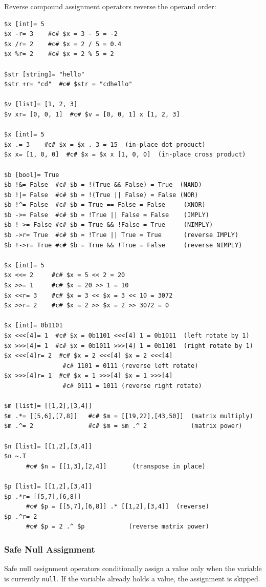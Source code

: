 Reverse compound assignment operators reverse the operand order:
\begin{verbatim}
$x [int]= 5
$x -r= 3    #c# $x = 3 - 5 = -2
$x /r= 2    #c# $x = 2 / 5 = 0.4
$x %r= 2    #c# $x = 2 % 5 = 2

$str [string]= "hello"
$str +r= "cd"  #c# $str = "cdhello"

$v [list]= [1, 2, 3]
$v xr= [0, 0, 1]  #c# $v = [0, 0, 1] x [1, 2, 3]

$x [int]= 5
$x .= 3    #c# $x = $x . 3 = 15  (in-place dot product)
$x x= [1, 0, 0]  #c# $x = $x x [1, 0, 0]  (in-place cross product)

$b [bool]= True
$b !&= False  #c# $b = !(True && False) = True  (NAND)
$b !|= False  #c# $b = !(True || False) = False (NOR)
$b !^= False  #c# $b = True == False = False     (XNOR)
$b ->= False  #c# $b = !True || False = False    (IMPLY)
$b !->= False #c# $b = True && !False = True     (NIMPLY)
$b ->r= True  #c# $b = !True || True = True      (reverse IMPLY)
$b !->r= True #c# $b = True && !True = False     (reverse NIMPLY)

$x [int]= 5
$x <<= 2     #c# $x = 5 << 2 = 20
$x >>= 1     #c# $x = 20 >> 1 = 10
$x <<r= 3    #c# $x = 3 << $x = 3 << 10 = 3072
$x >>r= 2    #c# $x = 2 >> $x = 2 >> 3072 = 0

$x [int]= 0b1101
$x <<<[4]= 1  #c# $x = 0b1101 <<<[4] 1 = 0b1011  (left rotate by 1)
$x >>>[4]= 1  #c# $x = 0b1011 >>>[4] 1 = 0b1101  (right rotate by 1)
$x <<<[4]r= 2  #c# $x = 2 <<<[4] $x = 2 <<<[4]
                #c# 1101 = 0111 (reverse left rotate)
$x >>>[4]r= 1  #c# $x = 1 >>>[4] $x = 1 >>>[4]
                #c# 0111 = 1011 (reverse right rotate)

$m [list]= [[1,2],[3,4]]
$m .*= [[5,6],[7,8]]   #c# $m = [[19,22],[43,50]]  (matrix multiply)
$m .^= 2               #c# $m = $m .^ 2            (matrix power)

$n [list]= [[1,2],[3,4]]
$n ~.T
      #c# $n = [[1,3],[2,4]]       (transpose in place)

$p [list]= [[1,2],[3,4]]
$p .*r= [[5,7],[6,8]]
      #c# $p = [[5,7],[6,8]] .* [[1,2],[3,4]]  (reverse)
$p .^r= 2
      #c# $p = 2 .^ $p            (reverse matrix power)
\end{verbatim}

\subsubsection{Safe Null Assignment}
Safe null assignment operators conditionally assign a value only when the variable is currently \texttt{null}. If the variable already holds a value, the assignment is skipped.

